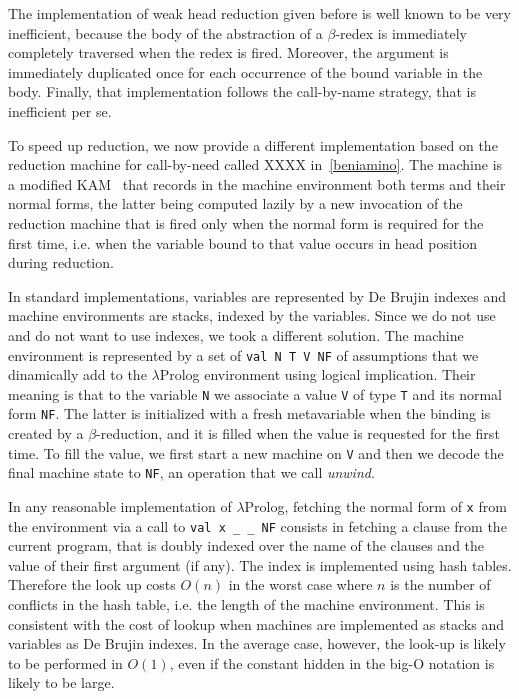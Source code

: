 The implementation of weak head reduction given before is well known to be very inefficient, because the body of the abstraction of a $\beta$-redex is immediately completely traversed when the redex is fired. Moreover, the argument is immediately duplicated once for each occurrence of the bound variable in the body. Finally, that implementation follows the call-by-name strategy, that is inefficient per se.

To speed up reduction, we now provide a different implementation based on the reduction machine for call-by-need called XXXX in~\ref{beniamino}. The machine is a modified KAM~\cite{???} that records in the machine environment both terms and their normal forms, the latter being computed lazily by a new invocation of the reduction machine that is fired only when the normal form is required for the first time, i.e. when the variable bound to that value occurs in head position during reduction.

In standard implementations, variables are represented by De Brujin indexes and machine environments are stacks, indexed by the variables. Since we do not use and do not want to use indexes, we took a different solution. The machine environment is represented by a set of \verb+val N T V NF+ of assumptions that we dinamically add to the $\lambda$Prolog environment using logical implication. Their meaning is that to the variable \verb+N+ we associate a value \verb+V+ of type \verb+T+ and its normal form \verb+NF+. The latter is initialized with a fresh metavariable when the binding is created by a $\beta$-reduction, and it is filled when the value is requested for the first time. To fill the value, we first start a new machine on \verb+V+ and then we decode the final machine state to \verb+NF+, an operation that we call \emph{unwind}.

In any reasonable implementation of $\lambda$Prolog, fetching the normal form of \verb+x+ from the environment via a call to \verb+val x _ _ NF+ consists in fetching a clause from the current program, that is doubly indexed over the name of the clauses and the value of their first argument (if any). The index is implemented using hash tables. Therefore the look up costs $O(n)$ in the worst case where $n$ is the number of conflicts in the hash table, i.e. the length of the machine environment. This is consistent with the cost of lookup when machines are implemented as stacks and variables as De Brujin indexes. In the average case, however, the look-up is likely to be performed in $O(1)$, even if the constant hidden in the big-O notation is likely to be large.

